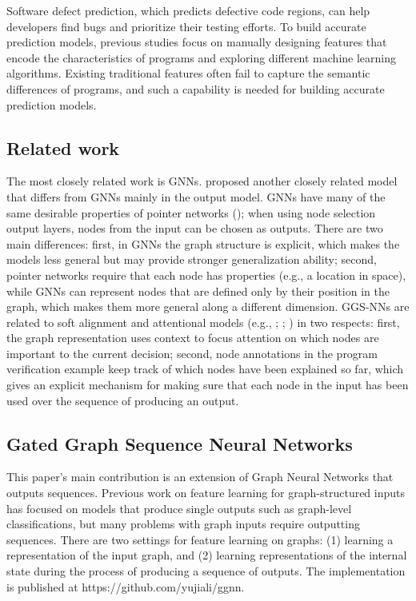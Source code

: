 \documentclass{article}
\begin{document}
Software defect prediction, which predicts defective code regions, can help developers find bugs and prioritize their testing efforts. To build accurate prediction models, previous studies focus on manually designing features that encode the characteristics of programs and exploring different machine learning algorithms. Existing traditional features often fail to capture the semantic differences of programs, and such a capability is needed for building accurate prediction models.
\subsection{Related work}

The most closely related work is GNNs. \cite{Micheli2009} proposed another closely related model that differs from GNNs mainly in the output model. GNNs have many of the same desirable properties of pointer networks (\cite{vinyals2017pointer}); when using node selection output layers, nodes from the input can be chosen as outputs. There are two main differences: first, in GNNs the graph structure is explicit, which makes the models less general but may provide stronger generalization ability; second, pointer networks require that each node has properties (e.g., a location in space), while GNNs can represent nodes that are defined only by their position in the graph, which makes them more general along a different dimension.
GGS-NNs are related to soft alignment and attentional models (e.g., \cite{bahdanau2016neural}; \cite{kumar2016ask}; \cite{sukhbaatar2015endtoend}) in two respects: first, the graph representation uses context to focus attention on which nodes are important to the current decision; second, node annotations in the program verification example keep track of which nodes have been explained so far, which gives an explicit mechanism for making sure that each node in the input has been used over the sequence of producing an output.  

\subsection{Gated Graph Sequence Neural Networks}
This paper's main contribution is an extension of Graph Neural Networks that outputs sequences. Previous work on feature learning for graph-structured inputs has focused on models that produce single outputs such as graph-level classifications, but many problems with graph inputs require outputting sequences. There are two settings for feature learning on graphs: (1) learning a representation of the input graph, and (2) learning representations of the internal state during the process of producing a sequence of outputs. The implementation is published at https://github.com/yujiali/ggnn.
\end{document}
